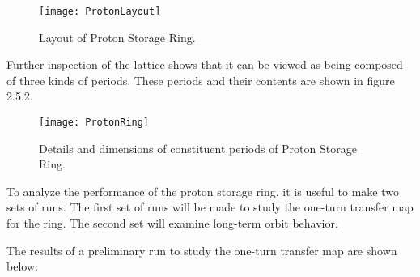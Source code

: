 \begin{figure}[hbp]
  \centering
  \texttt{[image: ProtonLayout]}
  \caption{Layout of Proton Storage Ring.}
\end{figure}

     Further inspection of the lattice shows that it can be viewed as being
composed of three kinds of periods.  These periods and their contents are
shown in figure 2.5.2.

\begin{figure}[htb]
  \centering
  \texttt{[image: ProtonRing]}
  \caption{Details and dimensions of constituent
                       periods of Proton Storage Ring.}
\end{figure}


     To analyze the performance of the proton storage ring, it is useful to
make two sets of \Mary runs.  The first set of runs will be made to study
the one-turn transfer map for the ring.  The second set will examine
long-term orbit behavior.

     The results of a preliminary run to study the one-turn transfer map
are shown below:


